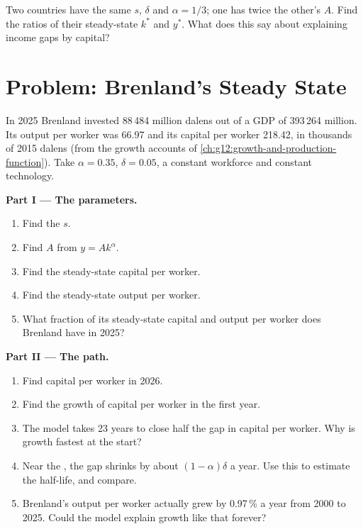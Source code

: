 \begin{exercise}[$\star\star\star$]\label{exo:g12:solow-first-look:15}
Two countries have the same $s$, $\delta$ and $\alpha = 1/3$; one has twice the other's $A$. Find the ratios of their steady-state $k^*$ and $y^*$. What does this say about
explaining income gaps by capital?
\end{exercise}

\section{Problem: Brenland's Steady State}

\begin{problem}
\label{pb:g12:solow-first-look:1}
In 2025 Brenland invested 88\,484 million dalens out of a GDP of 393\,264 million. Its output per worker was 66.97 and its capital per worker 218.42, in thousands of 2015
dalens (from the growth accounts of \cref{ch:g12:growth-and-production-function}). Take $\alpha = 0.35$, $\delta = 0.05$, a constant workforce and constant technology.

\medskip
\noindent\textbf{Part I --- The parameters.}
\begin{enumerate}
\item Find the  $s$.
\item Find $A$ from $y = Ak^{\alpha}$.
\item Find the steady-state capital per worker.
\item Find the steady-state output per worker.
\item What fraction of its steady-state capital and output per worker does Brenland have in 2025?
\end{enumerate}

\medskip
\noindent\textbf{Part II --- The path.}
\begin{enumerate}[resume]
\item Find capital per worker in 2026.
\item Find the growth of capital per worker in the first year.
\item The model takes 23 years to close half the gap in capital per worker. Why is growth fastest at the start?
\item Near the , the gap shrinks by about $(1 - \alpha)\delta$ a year. Use this to estimate the half-life, and compare.
\item Brenland's output per worker actually grew by 0.97\,\% a year from 2000 to 2025. Could the model explain growth like that forever?
\end{enumerate}


\end{problem}
